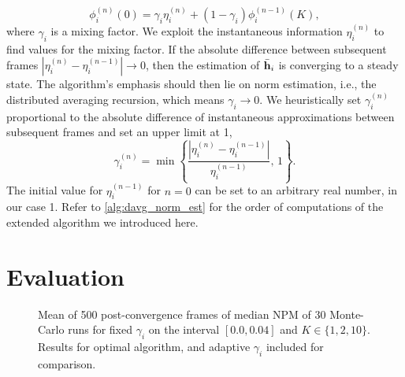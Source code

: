 \documentclass{article}
\begin{document}
\begin{equation}
    \phi_i^{(n)}(0) = \gamma_i \eta_i^{(n)} + (1-\gamma_i) \phi_i^{(n-1)}(K),
\end{equation}
where \(\gamma_i\) is a mixing factor.
We exploit the instantaneous information \(\eta_i^{(n)}\) to find values for the mixing factor.
If the absolute difference between subsequent frames \(| \eta_i^{(n)} - \eta_i^{(n-1)} | \to 0\), then the estimation of \(\bar{\bm{\mathrm{h}}}_i\) is converging to a steady state.
The algorithm's emphasis should then lie on norm estimation, i.e., the distributed averaging recursion, which means \(\gamma_i \to 0\).
We heuristically set \(\gamma_i^{(n)}\) proportional to the absolute difference of instantaneous approximations between subsequent frames and set an upper limit at 1,
\begin{equation}
    \gamma_i^{(n)} = \min \left\lbrace \frac{| \eta_i^{(n)} - \eta_i^{(n-1)} |}{\eta_i^{(n-1)}},\,1\right\rbrace.\label{eq:adaptivenormest:adaptivegamma}
\end{equation}
The initial value for \(\eta_i^{(n-1)}\) for \(n=0\) can be set to an arbitrary real number, in our case 1.
Refer to \autoref{alg:davg_norm_est} for the order of computations of the extended algorithm we introduced here.

\section{Evaluation}
\label{sec:simulations}
\begin{figure}[t]
    \centering
    
    \vspace*{-0.6cm}
    \caption[]{Mean of 500 post-convergence frames of median NPM of 30 Monte-Carlo runs for fixed \(\gamma_i\) on the interval \([0.0, 0.04]\) and \(K \in \{1,2,10\}\). Results for optimal algorithm, and adaptive \(\gamma_i\) included for comparison.}
    \label{fig:simulations:avgNPMgamma}
\end{figure}
\end{document}
